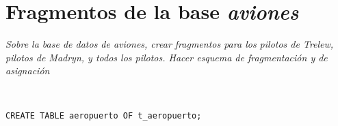 \section{Fragmentos de la base \emph{aviones}}
\emph{Sobre la base de datos de aviones, crear fragmentos para los pilotos de Trelew, pilotos de Madryn, y todos los pilotos. Hacer esquema de fragmentación y de asignación} 

~\\







\clearpage
\printbibliography




\vspace*{5mm}
\lstset{style=sql}
\begin{lstlisting}
CREATE TABLE aeropuerto OF t_aeropuerto;
\end{lstlisting}

